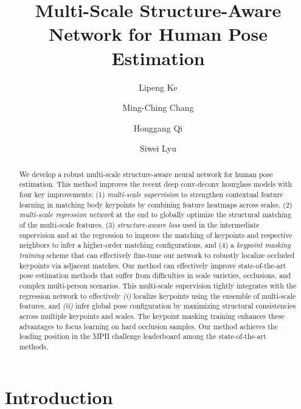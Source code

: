 \documentclass[runningheads]{llncs}
\begin{document}
\title{Multi-Scale Structure-Aware Network for Human Pose Estimation}
\author{Lipeng Ke \and
Ming-Ching Chang \and
Honggang Qi \and
Siwei Lyu
}
\maketitle              \begin{abstract}
We develop a robust multi-scale structure-aware neural network for human pose estimation. This method improves the recent deep conv-deconv hourglass models with four key improvements: (1) {\em multi-scale supervision} to strengthen contextual feature learning in matching body keypoints by combining feature heatmaps across scales, (2) {\em multi-scale regression network} at the end to globally optimize the structural matching of the multi-scale features, (3) {\em structure-aware loss} used in the intermediate supervision and at the regression to improve the matching of keypoints and respective neighbors to infer a higher-order matching configurations, and (4) a {\em keypoint masking training} scheme that can effectively fine-tune our network to robustly localize occluded keypoints via adjacent matches. 
Our method can effectively improve state-of-the-art pose estimation methods that suffer from difficulties in scale varieties, occlusions, and complex multi-person scenarios. 
This multi-scale supervision tightly integrates with the regression network to effectively {\em (i)} localize keypoints using the ensemble of multi-scale features, and {\em (ii)} infer global pose configuration by maximizing structural consistencies across multiple keypoints and scales.
The keypoint masking training enhances these advantages to focus learning on hard occlusion samples. 
Our method achieves the leading position in the MPII challenge leaderboard among the state-of-the-art methods.
\end{abstract}





\section{Introduction}
\end{document}
